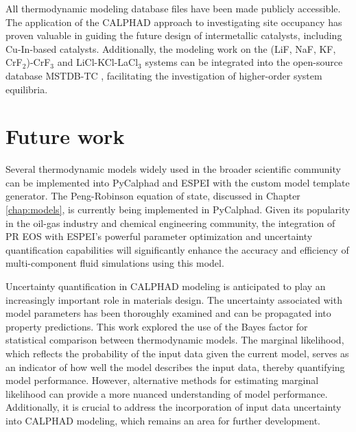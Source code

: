 All thermodynamic modeling database files have been made publicly accessible. The application of the CALPHAD approach to investigating site occupancy has proven valuable in guiding the future design of intermetallic catalysts, including Cu-In-based catalysts. Additionally, the modeling work on the (LiF, NaF, KF, CrF${_2}$)-CrF${_3}$ and LiCl-KCl-LaCl${_3}$ systems can be integrated into the open-source database MSTDB-TC \cite{ard2022development}, facilitating the investigation of higher-order system equilibria.

\section{Future work} \label{conclusion:sec:future}
Several thermodynamic models widely used in the broader scientific community can be implemented into PyCalphad and ESPEI with the custom model template generator. The Peng-Robinson equation of state, discussed in Chapter \ref{chap:models}, is currently being implemented in PyCalphad. Given its popularity in the oil-gas industry and chemical engineering community, the integration of PR EOS with ESPEI's powerful parameter optimization and uncertainty quantification capabilities will significantly enhance the accuracy and efficiency of multi-component fluid simulations using this model. 

Uncertainty quantification in CALPHAD modeling is anticipated to play an increasingly important role in materials design. The uncertainty associated with model parameters has been thoroughly examined \cite{paulson2019quantified} and can be propagated into property predictions. This work explored the use of the Bayes factor for statistical comparison between thermodynamic models. The marginal likelihood, which reflects the probability of the input data given the current model, serves as an indicator of how well the model describes the input data, thereby quantifying model performance. However, alternative methods for estimating marginal likelihood can provide a more nuanced understanding of model performance. Additionally, it is crucial to address the incorporation of input data uncertainty into CALPHAD modeling, which remains an area for further development.

